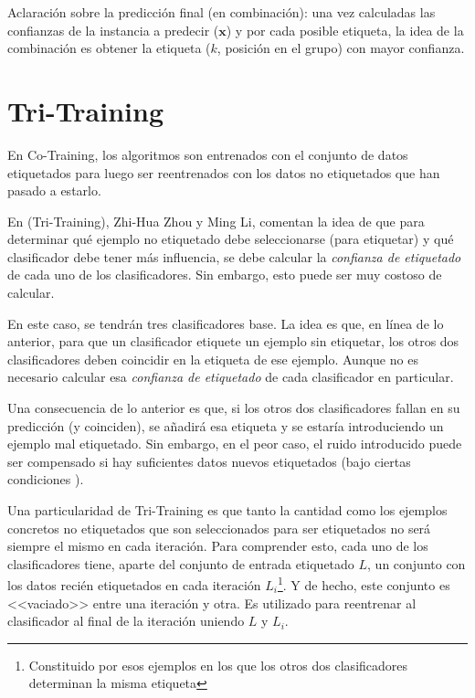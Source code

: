 Aclaración sobre la predicción final (en combinación): una vez calculadas las
confianzas de la instancia a predecir ($\mathbf{x}$) y por cada posible etiqueta, la idea
de la combinación es obtener la etiqueta ($k$, posición en el grupo) con mayor
confianza.

\clearpage
\clearpage

\section{Tri-Training}

En Co-Training, los algoritmos son entrenados con el conjunto de datos
etiquetados para luego ser reentrenados con los datos no etiquetados que han
pasado a estarlo.

En \cite{1512038} (Tri-Training), Zhi-Hua Zhou y Ming Li, comentan la idea de
que para determinar qué ejemplo no etiquetado debe seleccionarse (para
etiquetar) y qué clasificador debe tener más influencia, se debe calcular la
\textit{confianza de etiquetado} de cada uno de los clasificadores. Sin embargo, esto
puede ser muy costoso de calcular.

En este caso, se tendrán tres clasificadores base. La idea es que, en línea de
lo anterior, para que un clasificador etiquete un ejemplo sin etiquetar, los
otros dos clasificadores deben coincidir en la etiqueta de ese ejemplo. Aunque
no es necesario calcular esa \textit{confianza de etiquetado} de cada
clasificador en particular.

Una consecuencia de lo anterior es que, si los otros dos clasificadores fallan
en su predicción (y coinciden), se añadirá esa etiqueta y se estaría
introduciendo un ejemplo mal etiquetado. Sin embargo, en el peor caso, el ruido
introducido puede ser compensado si hay suficientes datos nuevos etiquetados
(bajo ciertas condiciones \cite{1512038}).

Una particularidad de Tri-Training es que tanto la cantidad como los ejemplos
concretos no etiquetados que son seleccionados para ser etiquetados no será
siempre el mismo en cada iteración. Para comprender esto, cada uno de los
clasificadores tiene, aparte del conjunto de entrada etiquetado $L$, un conjunto
con los datos recién etiquetados en cada iteración $L_i$\footnote{Constituido
por esos ejemplos en los que los otros dos clasificadores determinan la misma
etiqueta}. Y de hecho, este conjunto es <<vaciado>> entre una iteración y otra.
Es utilizado para reentrenar al clasificador al final de la iteración uniendo
$L$ y $L_i$.

